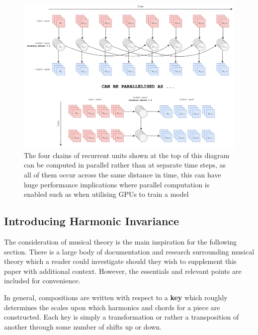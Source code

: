 \documentclass[12pt,]{article}
\begin{document}
\begin{figure}
\centering
\includegraphics{Images/dilatedrnnparallel.png}
\caption{The four chains of recurrent units shown at the top of this
diagram can be computed in parallel rather than at separate time steps,
as all of them occur across the same distance in time, this can have
huge performance implications where parallel computation is enabled such
as when utilising GPUs to train a model}
\end{figure}

\hypertarget{introducing-harmonic-invariance}{%
\subsection{Introducing Harmonic
Invariance}\label{introducing-harmonic-invariance}}

The consideration of musical theory is the main inspiration for the
following section. There is a large body of documentation and research
surrounding musical theory which a reader could investigate should they
wish to supplement this paper with additional context. However, the
essentials and relevant points are included for convenience.

In general, compositions are written with respect to a \textbf{key}
which roughly determines the scales upon which harmonics and chords for
a piece are constructed. Each key is simply a transformation or rather a
transposition of another through some number of shifts up or down.
\end{document}
